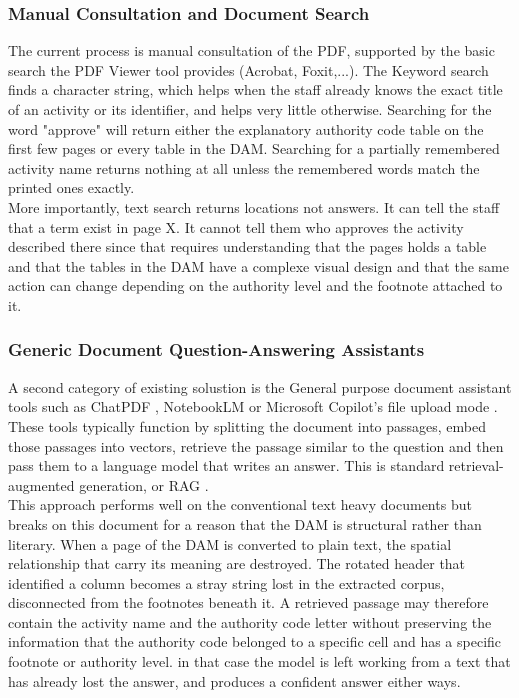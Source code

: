 \subsubsection{Manual Consultation and Document Search}

The current process is manual consultation of the PDF, supported by the basic search the PDF Viewer tool provides (Acrobat, Foxit,...). The Keyword search finds a character string, which helps when the staff already knows the exact title of an activity or its identifier, and helps very little otherwise. Searching for the word "approve" will return either the explanatory authority code table on the first few pages or every table in the DAM. Searching for a partially remembered activity name returns nothing at all unless the remembered words match the printed ones exactly.\\[0.3cm]

More importantly, text search returns locations not answers. It can tell the staff that a term exist in page X. It cannot tell them who approves the activity described there since that requires understanding that the pages holds a table and that the tables in the DAM have a complexe visual design and that the same action can change depending on the authority level and the footnote attached to it.

\subsubsection{Generic Document Question-Answering Assistants}

A second category of existing solustion is the General purpose document assistant tools such as ChatPDF \citep{chatpdf}, NotebookLM \citep{notebooklm} or Microsoft Copilot's file upload mode \citep{ms365copilot}. These tools typically function by splitting the document into passages, embed those passages into vectors, retrieve the passage similar to the question and then pass them to a language model that writes an answer. This is standard retrieval-augmented generation, or RAG \citep{lewis2020rag}.\\[0.3cm]
This approach performs well on the conventional text heavy documents but breaks on this document for a reason that the DAM is structural rather than literary. When a page of the DAM is converted to plain text, the spatial relationship that carry its meaning are destroyed. The rotated header that identified a column becomes a stray string lost in the extracted corpus, disconnected from the footnotes beneath it. A retrieved passage may therefore contain the activity name and the authority code letter without preserving the information that the authority code belonged to a specific cell and has a specific footnote or authority level. in that case the model is left working from a text that has already lost the answer, and produces a confident answer either ways.


